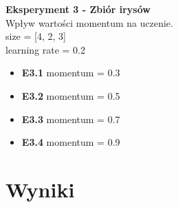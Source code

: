 \documentclass{classrep}
\begin{document}
	\textbf{Eksperyment 3 - Zbiór irysów}\\
		Wpływ wartości momentum na uczenie.\\
		size = [4, 2, 3]\\
		learning rate = 0.2
		\begin{itemize}
			\item \textbf{E3.1}
			 momentum = 0.3
			\item \textbf{E3.2} 
			momentum = 0.5
			\item \textbf{E3.3}
			momentum = 0.7
			\item \textbf{E3.4}
			momentum = 0.9
		\end{itemize}


\section{Wyniki}
\end{document}
